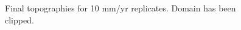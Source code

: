 \begin{figure}[!ht]
	\caption{Final topographies for 10 mm/yr replicates. Domain has been clipped.}
	\label{fig:010topo}
\end{figure}

